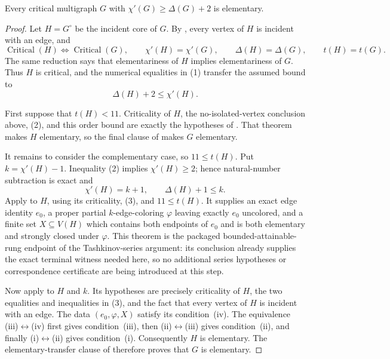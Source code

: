 \begin{theorem}
Every critical multigraph $G$ with
$\chi'(G)\ge\Delta(G)+2$ is elementary.
\end{theorem}
\begin{proof}
Let $H=G^{\circ}$ be the incident core of $G$.  By
, every vertex of $H$ is incident with an
edge, and
\[
 \operatorname{Critical}(H)\Longleftrightarrow
 \operatorname{Critical}(G),\qquad
 \chi'(H)=\chi'(G),\qquad
 \Delta(H)=\Delta(G),\qquad
 t(H)=t(G).                                             \tag{1}
\]
The same reduction says that elementariness of $H$ implies elementariness
of $G$.  Thus $H$ is critical, and the numerical equalities in (1) transfer
the assumed bound to
\[
                         \Delta(H)+2\leq\chi'(H).        \tag{2}
\]

First suppose that $t(H)<11$.  Criticality of $H$, the no-isolated-vertex
conclusion above, (2), and this order bound are exactly the hypotheses of
.  That theorem makes $H$ elementary, so the final
clause of  makes $G$ elementary.

It remains to consider the complementary case, so $11\leq t(H)$.  Put
$k=\chi'(H)-1$.  Inequality (2) implies $\chi'(H)\geq2$; hence natural-number
subtraction is exact and
\[
                 \chi'(H)=k+1,\qquad \Delta(H)+1\leq k. \tag{3}
\]
Apply  to $H$, using its criticality,
(3), and $11\leq t(H)$.  It supplies an exact edge identity $e_0$, a proper
partial $k$-edge-coloring $\varphi$ leaving exactly $e_0$ uncolored, and a
finite set $X\subseteq V(H)$ which contains both endpoints of $e_0$ and is
both elementary and strongly closed under $\varphi$.  This theorem is the
packaged bounded-attainable-rung endpoint of the Tashkinov-series argument:
its conclusion already supplies the exact terminal witness needed here, so
no additional series hypotheses or correspondence certificate are being
introduced at this step.

Now apply  to $H$ and $k$.  Its hypotheses are precisely
criticality of $H$, the two equalities and inequalities in (3), and the fact
that every vertex of $H$ is incident with an edge.  The data
$(e_0,\varphi,X)$ satisfy its condition~(iv).  The equivalence
(iii)$\leftrightarrow$(iv) first gives condition~(iii), then
(ii)$\leftrightarrow$(iii) gives condition~(ii), and finally
(i)$\leftrightarrow$(ii) gives condition~(i).  Consequently $H$ is
elementary.  The elementary-transfer clause of
 therefore proves that $G$ is elementary.
\end{proof}
